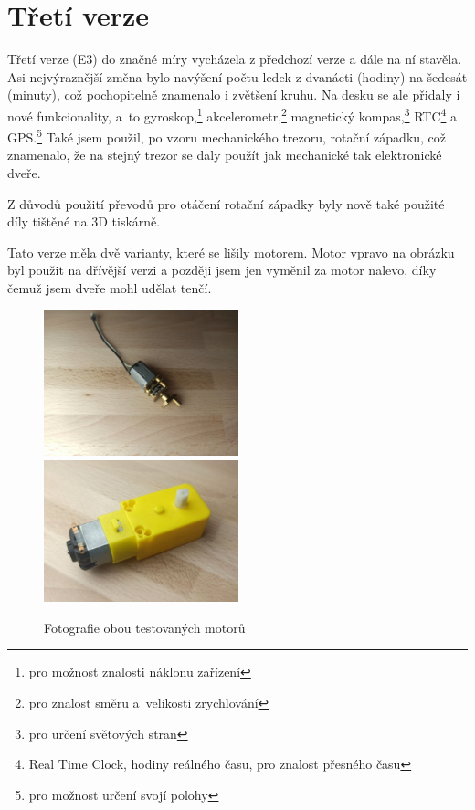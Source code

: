 \section{Třetí verze}
\label{E3-vyvoj}

Třetí verze (E3) do značné míry vycházela z předchozí verze a dále na ní stavěla. Asi nejvýraznější změna bylo navýšení počtu 
ledek z dvanácti (hodiny) na šedesát (minuty), což pochopitelně znamenalo i zvětšení kruhu. Na desku se ale přidaly i nové funkcionality,
a~to gyroskop,\footnote{pro možnost znalosti náklonu zařízení} akcelerometr,\footnote{pro znalost směru a~velikosti zrychlování} magnetický kompas,\footnote{pro určení světových
stran} RTC\footnote{Real Time Clock, hodiny reálného času, pro znalost přesného času} a GPS.\footnote{pro možnost určení svojí polohy}
Také jsem použil, po vzoru mechanického trezoru, rotační západku, což znamenalo, že na stejný trezor se daly použít jak mechanické tak 
elektronické dveře.

Z důvodů použití převodů pro otáčení rotační západky byly nově také použité díly tištěné na 3D tiskárně. 

Tato verze měla dvě varianty, které se lišily motorem.
Motor vpravo na obrázku  byl použit na dřívější verzi a později jsem jen vyměnil za motor nalevo, díky čemuž jsem dveře mohl udělat tenčí. %
\begin{figure}[htbp]
    \centering
    \includegraphics[width=160pt]{kapitoly/obrazky/E3/motory/hodinovyStrojek.jpg}
    \includegraphics[width=160pt]{kapitoly/obrazky/E3/motory/zluty_motor.jpg}
    \caption{Fotografie obou testovaných motorů} 
    \label{fig:E3-motory}
\end{figure}
